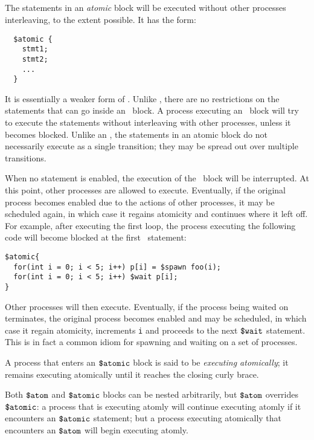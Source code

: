 \subsection{\catomic} The statements in an \emph{atomic} block
will be executed without other processes interleaving, to
the extent possible.  It has the form:
\begin{verbatim}
  $atomic {
    stmt1;
    stmt2;
    ...
  }
\end{verbatim}
It is essentially a weaker form of \catom.  Unlike \catom, there are
no restrictions on the statements that can go inside an \catomic\
block.  A process executing an \catomic~block will try to execute the
statements without interleaving with other processes, unless it
becomes blocked.  Unlike an \catom, the statements in an atomic block
do not necessarily execute as a single transition; they may be spread
out over multiple transitions.

When no statement is enabled, the execution of the \catomic\ block
will be interrupted.  At this point, other processes are allowed to
execute.  Eventually, if the original process becomes enabled due to
the actions of other processes, it may be scheduled again, in which
case it regains atomicity and continues where it left off.  For
example, after executing the first loop, the process executing the
following code will become blocked at the first \cwait\ statement:
 \begin{verbatim}  
$atomic{
  for(int i = 0; i < 5; i++) p[i] = $spawn foo(i);
  for(int i = 0; i < 5; i++) $wait p[i];
}
\end{verbatim}
Other processes will then execute. Eventually, if the process being
waited on terminates, the original process becomes enabled and may be
scheduled, in which case it regain atomicity, increments \texttt{i}
and proceeds to the next $\mbox{\texttt{\${}wait}}$ statement.  This is in fact a common
idiom for spawning and waiting on a set of processes.

A process that enters an $\mbox{\texttt{\${}atomic}}$ block is said to be
\emph{executing atomically}; it remains executing atomically until it
reaches the closing curly brace.

Both $\mbox{\texttt{\${}atom}}$ and $\mbox{\texttt{\${}atomic}}$ blocks can be nested arbitrarily, but
$\mbox{\texttt{\${}atom}}$ overrides $\mbox{\texttt{\${}atomic}}$: a process that is executing atomly will
continue executing atomly if it encounters an $\mbox{\texttt{\${}atomic}}$ statement;
but a process executing atomically that encounters an $\mbox{\texttt{\${}atom}}$ will
begin executing atomly.

